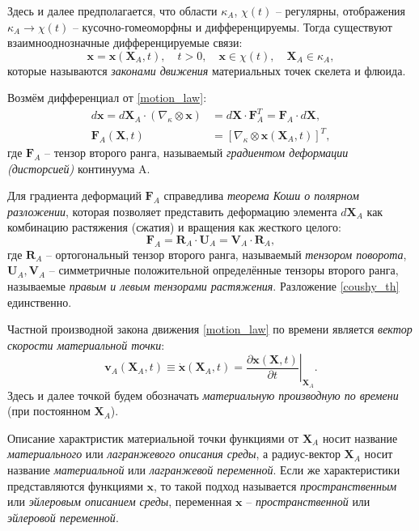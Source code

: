 	Здесь и далее предполагается, что области $\kappa_A$, $\chi(t)$ -- регулярны, отображения $\kappa_A \to \chi(t)$ -- кусочно-гомеоморфны и дифференцируемы. Тогда существуют взаимнооднозначные дифференцируемые связи:
\begin{equation}
	\label{motion_law}
	\mathbf{x} = \mathbf{x}(\mathbf{X}_A, t), \quad t > 0,\quad \mathbf{x} \in \chi(t), \quad \mathbf{X}_A \in \kappa_A,
\end{equation}
	которые называются \textit{законами движения} материальных точек скелета и флюида.
	
	Возмём дифференциал от \eqref{motion_law}:
\begin{align}
	\label{gradient}
	d\mathbf{x} = d\mathbf{X}_A \cdot \left(\nabla_{\kappa} \otimes \mathbf{x} \right) &= d\mathbf{X} \cdot \mathbf{F}_A^T = \mathbf{F}_A \cdot d\mathbf{X},\nonumber\\
	\mathbf{F}_A(\mathbf{X}, t) &= \left[\nabla_{\kappa} \otimes \mathbf{x}(\mathbf{X}_A, t)\right]^T,
\end{align}
	где $\mathbf{F}_A$ -- тензор второго ранга, называемый \textit{градиентом деформации (дисторсией)} континуума A.
	
	Для градиента деформаций $\textbf{F}_A$ справедлива \textit{теорема Коши о полярном разложении}, которая позволяет представить деформацию элемента $d\mathbf{X}_A$ как комбинацию растяжения (сжатия) и вращения как жесткого целого:
\begin{equation}
	\label{coushy_th}
	\mathbf{F}_A = \mathbf{R}_A \cdot \mathbf{U}_A = \mathbf{V}_A \cdot \mathbf{R}_A,
\end{equation}
	где $\mathbf{R}_A$ -- ортогональный тензор второго ранга, называемый \textit{тензором поворота},
	$\mathbf{U}_A, \mathbf{V}_A$ -- симметричные положительной определённые тензоры второго ранга, называемые \textit{правым и левым тензорами растяжения}. Разложение \eqref{coushy_th} единственно.
	
	Частной производной закона движения \eqref{motion_law} по времени является \textit{вектор скорости материальной точки}:
\begin{equation}
	\label{velocity}
	\mathbf{v}_A(\mathbf{X}_A, t) \equiv \dot{\mathbf{x}}(\mathbf{X}_A, t) = \left.\frac{\partial\mathbf{x}(\mathbf{X}, t)}{\partial t}\right|_{\mathbf{X}_A}.
\end{equation}
	Здесь и далее точкой будем обозначать \textit{материальную производную по времени} (при постоянном $\mathbf{X}_A$).
	
	Описание характристик материальной точки функциями от $\mathbf{X}_A$ носит название \textit{материального} или \textit{лагранжевого описания среды}, а радиус-вектор $\textbf{X}_A$ носит название \textit{материальной} или \textit{лагранжевой переменной}. Если же характеристики представляются функциями $\mathbf{x}$, то такой подход называется \textit{пространственным} или \textit{эйлеровым описанием среды}, переменная $\mathbf{x}$ -- \textit{пространственной} или \textit{эйлеровой переменной}.

